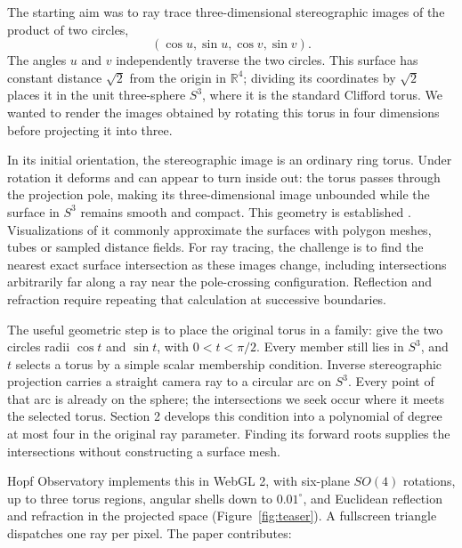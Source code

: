 \documentclass{jcgt}
\begin{document}
The starting aim was to ray trace three-dimensional stereographic images
of the product of two circles, \[
(\cos u,\sin u,\cos v,\sin v).
\] The angles \(u\) and \(v\) independently traverse the two circles.
This surface has constant distance \(\sqrt{2}\) from the origin in
\(\mathbb R^4\); dividing its coordinates by \(\sqrt{2}\) places it in
the unit three-sphere \(S^3\), where it is the standard Clifford torus.
We wanted to render the images obtained by rotating this torus in four
dimensions before projecting it into three.

In its initial orientation, the stereographic image is an ordinary ring
torus. Under rotation it deforms and can appear to turn inside out: the
torus passes through the projection pole, making its three-dimensional
image unbounded while the surface in \(S^3\) remains smooth and compact.
This geometry is established \citep{banchoff1990, mccuan1998}.
Visualizations of it commonly approximate the surfaces with polygon
meshes, tubes or sampled distance fields. For ray tracing, the challenge
is to find the nearest exact surface intersection as these images
change, including intersections arbitrarily far along a ray near the
pole-crossing configuration. Reflection and refraction require repeating
that calculation at successive boundaries.

The useful geometric step is to place the original torus in a family:
give the two circles radii \(\cos t\) and \(\sin t\), with
\(0<t<\pi/2\). Every member still lies in \(S^3\), and \(t\) selects a
torus by a simple scalar membership condition. Inverse stereographic
projection carries a straight camera ray to a circular arc on \(S^3\).
Every point of that arc is already on the sphere; the intersections we
seek occur where it meets the selected torus. Section 2 develops this
condition into a polynomial of degree at most four in the original ray
parameter. Finding its forward roots supplies the intersections without
constructing a surface mesh.

Hopf Observatory implements this in WebGL 2, with six-plane \(SO(4)\)
rotations, up to three torus regions, angular shells down to
\(0.01^\circ\), and Euclidean reflection and refraction in the projected
space (Figure~\ref{fig:teaser}). A fullscreen triangle dispatches one ray per pixel.
The paper contributes:
\end{document}
